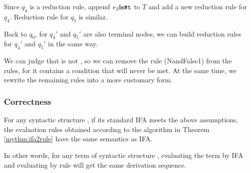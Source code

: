 
Since $q_4$ is a reduction rule, append $e_2 \mbox{\rm \bf is} \mbox{\tt \#t}$ to $T$ and add a new reduction rule for $q_4$. Reduction rule for $q_5$ is similar.



Back to $q_0$, for $q_4'$ and $q_5'$ are also terminal nodes, we can build reduction rules for $q_4'$ and $q_5'$ in the same way.



We can judge that  is not , so we can remove the rule (NandFalse1) from the rules, for it contains a condition that will never be met. At the same time, we rewrite the remaining rules into a more customary form.


\subsubsection{Correctness}

\begin{lemma}
\label{lemma:ifa2rule-correct}
For any syntactic structure , if its standard IFA meets the above assumptions, the evaluation rules obtained according to the algorithm in Theorem \ref{mythm:ifa2rule} have the same semantics as IFA.
\end{lemma}

In other words, for any term of syntactic structure , evaluating the term by IFA and evaluating by rule will get the same derivation sequence.

